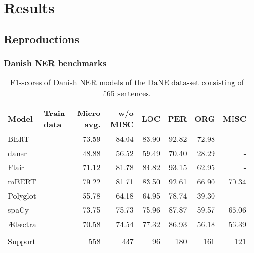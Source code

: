 \documentclass[main.tex]{subfiles}
\begin{document}
\chapter{Results}

\section{Reproductions}
\subsection{Danish NER benchmarks}
\begin{table}[H]
	\begin{center}
		\begin{tabular}{l l r r r r r r}
			Model & Train data & Micro avg. & w/o MISC & LOC & PER & ORG & MISC \\
			\hline
			BERT &  & 73.59 & 84.04 & 83.90 & 92.82 & 72.98 & - \\
			daner &  & 48.88 & 56.52 & 59.49 & 70.40 & 28.29 & - \\
			Flair &  & 71.12 & 81.78 & 84.82 & 93.15 & 62.95 & - \\
			mBERT &  & 79.22 & 81.71 & 83.50 & 92.61 & 66.90 & 70.34 \\
			Polyglot &  & 55.78 & 64.18 & 64.95 & 78.74 & 39.30 & - \\
			spaCy &  & 73.75 & 75.73 & 75.96 & 87.87 & 59.57 & 66.06 \\
			Ælæctra &  & 70.58 & 74.54 & 77.32 & 86.93 & 56.18 & 56.39 \\
			 &  &  &  &  &  &  &  \\
			Support &  & 558 & 437 & 96 & 180 & 161 & 121 \\
		\end{tabular}
	\end{center}
	\caption{F1\pro-scores of Danish NER models of the DaNE data-set consisting of 565 sentences.}
	\label{tab:DaNE}
\end{table}
\end{document}
